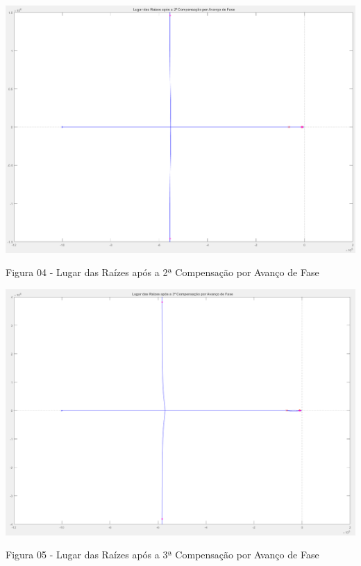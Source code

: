 \documentclass[a4paper]{article}
\begin{document}
\begin{center}
	\includegraphics[width=40em,keepaspectratio]{lugar_das_raizes_12_compensacao_requerimentos}
	\par Figura 04 - Lugar das Raízes após a 2ª Compensação por Avanço de Fase
\end{center}
 
 \begin{center}
 	\includegraphics[width=40em,keepaspectratio]{lugar_das_raizes_13_compensacao_requerimentos}
 	\par Figura 05 - Lugar das Raízes após a 3ª Compensação por Avanço de Fase
 \end{center}
\end{document}
